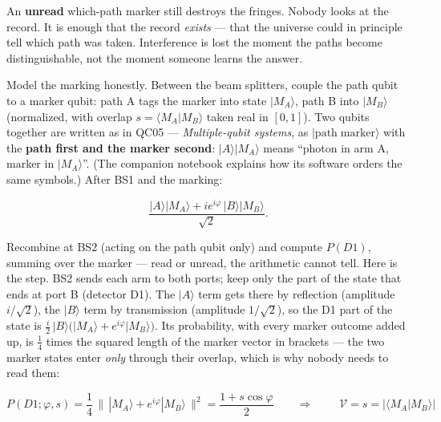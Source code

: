 \documentclass[a4paper,11pt]{article}
\providecommand{\ket}[1]{|#1\rangle}
\providecommand{\braket}[2]{\langle#1|#2\rangle}
\begin{document}
\begin{shockbox}
An \textbf{unread} which-path marker still destroys the fringes. Nobody looks at the
record. It is enough that the record \emph{exists} --- that the universe could in
principle tell which path was taken. Interference is lost the moment the paths become
distinguishable, not the moment someone learns the answer.
\end{shockbox}

Model the marking honestly. Between the beam splitters, couple the path qubit to a
marker qubit: path A tags the marker into state $\ket{M_A}$, path B into $\ket{M_B}$
(normalized, with overlap $s = \braket{M_A}{M_B}$ taken real in $[0,1]$). Two qubits
together are written as in QC05 --- \textit{Multiple-qubit systems}, as
$\ket{\text{path}\;\text{marker}}$ with the \textbf{path first and the marker
second}: $\ket{A}\ket{M_A}$ means ``photon in arm A, marker in $\ket{M_A}$''. (The
companion notebook explains how its software orders the same symbols.) After BS1 and
the marking:

\begin{equation}
    \frac{\ket{A}\ket{M_A} + i e^{i\varphi}\,\ket{B}\ket{M_B}}{\sqrt 2}.
    \label{eq:marked}
\end{equation}

Recombine at BS2 (acting on the path qubit only) and compute $P(D1)$, summing over
the marker --- read or unread, the arithmetic cannot tell. Here is the step. BS2 sends
each arm to both ports; keep only the part of the state that ends at port B (detector
D1). The $\ket{A}$ term gets there by reflection (amplitude $i/\sqrt 2$), the $\ket{B}$
term by transmission (amplitude $1/\sqrt 2$), so the D1 part of the state is
$\tfrac{i}{2}\,\ket{B}\bigl(\ket{M_A} + e^{i\varphi}\ket{M_B}\bigr)$. Its probability,
with every marker outcome added up, is $\tfrac14$ times the squared length of the
marker vector in brackets --- the two marker states enter \emph{only} through their overlap, which is
why nobody needs to read them:

\begin{equation}
    P(D1; \varphi, s)
    = \frac{1}{4}\,\bigl\|\, \ket{M_A} + e^{i\varphi}\ket{M_B} \,\bigr\|^2
    = \frac{1 + s\cos\varphi}{2}
    \qquad\Longrightarrow\qquad
    \boxed{\;\mathcal{V} = s = |\braket{M_A}{M_B}|\;}
    \label{eq:complementarity}
\end{equation}
\end{document}
